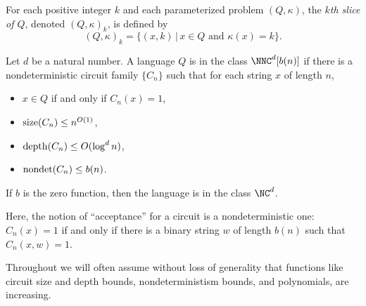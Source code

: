 \begin{definition}
  For each positive integer $k$ and each parameterized problem $(Q, \kappa)$, the \emph{$k$th slice of $Q$}, denoted $(Q, \kappa)_k$, is defined by
  \[
  (Q, \kappa)_k = \{(x, k) \, | \, x \in Q \text{ and } \kappa(x) = k\}.
  \]
\end{definition}

\begin{definition}
  Let $d$ be a natural number.
  A language $Q$ is in the class $\NNC^d[b(n)]$ if there is a nondeterministic circuit family $\{C_n\}$ such that for each string $x$ of length $n$,
  \begin{itemize}
  \item $x \in Q$ if and only if $C_n(x) = 1$,
  \item $\operatorname{size}(C_n) \leq n^{O(1)}$,
  \item $\operatorname{depth}(C_n) \leq O(\log^d n)$,
  \item $\operatorname{nondet}(C_n) \leq b(n)$.
  \end{itemize}
  If $b$ is the zero function, then the language is in the class $\NC^d$.
\end{definition}

Here, the notion of ``acceptance'' for a circuit is a nondeterministic one: $C_n(x) = 1$ if and only if there is a binary string $w$ of length $b(n)$ such that $C_n(x, w) = 1$.

Throughout we will often assume without loss of generality that functions like circuit size and depth bounds, nondeterministism bounds, and polynomials, are increasing.
